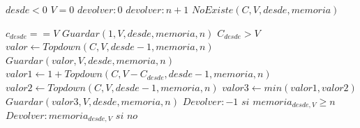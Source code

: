 \documentclass[8pt,a4paper]{article}
\begin{document}
\begin{codebox}
 \li \If $desde < 0$ \Then
  	\li \If $V =0$ \Then 
  	\li $devolver:0$
  	\li \Else
  	\li $devolver:n+1$
  \End 
 \End
  \li \If $NoExiste(C,V,desde,memoria)$ \Then
 
\li \If $c_{desde}==V$ \Then
	\li	$Guardar(1,V,desde,memoria,n)$
	\li \Else
\li \If $C_{desde} > V$ \Then  
		\li $valor \gets Topdown(C,V,desde-1,memoria,n)$
		\li $Guardar(valor, V, desde, memoria,n)$
		\li \Else
		\li $valor1 \gets 1 + Topdown(C,V-C_{desde},desde-1,memoria,n)$
		\li $valor2 \gets Topdown(C,V,desde-1,memoria,n) $
		\li $valor3 \gets min(valor1,valor2)$ 
		\li $Guardar(valor3,V,desde,memoria,n)$	
  		\End
  \End
  \End
\li $Devolver: -1$  $si$ $memoria_{desde,V} \geq n$
\li $Devolver: memoria_{desde,V}$ $si$ $no$

\end{codebox}
\end{document}
